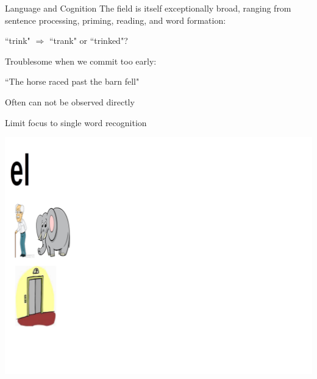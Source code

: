 \documentclass{beamer}
\newcommand{\vp}{\vspace{2mm}}
\begin{document}
\begin{frame}{Language and Cognition}\large
The field is itself exceptionally broad, ranging from sentence processing, priming, reading, and word formation:

\begin{center}
``trink" $\Rightarrow$ ``trank" or ``trinked"? \vp
\end{center}

Troublesome when we commit too early:

\begin{center}
``The horse raced past the barn fell"  \vp
\end{center}

Often can not be observed directly  \vp

Limit focus to single word recognition 



\end{frame}


\begin{frame}
\begin{center}
\includegraphics[scale=0.3]{img/ele_1.png}
\end{center}
\end{frame}
\end{document}
